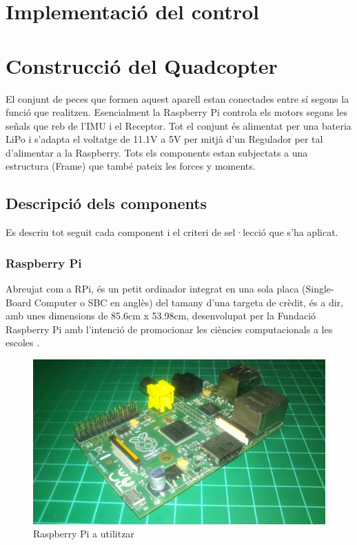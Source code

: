 \documentclass[twoside]{article}
\begin{document}
\section{Implementació del control} \label{implement}

\newpage
\section{Construcció del Quadcopter} \label{construc}
El conjunt de peces que formen aquest aparell estan conectades entre sí segons la funció que realitzen. Esencialment la Raspberry Pi controla els motors segons les señals que reb de l'IMU i el Receptor. Tot el conjunt és alimentat per una bateria LiPo i s'adapta el voltatge de 11.1V a 5V per mitjà d'un Regulador per tal d'alimentar a la Raspberry. Tots els components estan subjectats a una estructura (Frame) que també pateix les forces y moments.  

\subsection{Descripció dels components}
Es descriu tot seguit cada component i el criteri de sel·lecció que s'ha aplicat.
\subsubsection*{Raspberry Pi} 
Abreujat com a RPi, és un petit ordinador integrat en una sola placa (Single-Board Computer o SBC en anglès) del tamany d'una targeta de crèdit, és a dir, amb unes dimensions de 85.6cm x 53.98cm, desenvolupat per la Fundació Raspberry Pi amb l'intenció de promocionar les ciències computacionals a les escoles \cite{RPiWiki}. 

\begin{figure}[h!]
\begin{center}
\includegraphics[scale=0.06]{images/RPi.jpg}
\caption{Raspberry Pi a utilitzar}
\label{RPiImage}
\end{center}
\end{figure}
\end{document}

